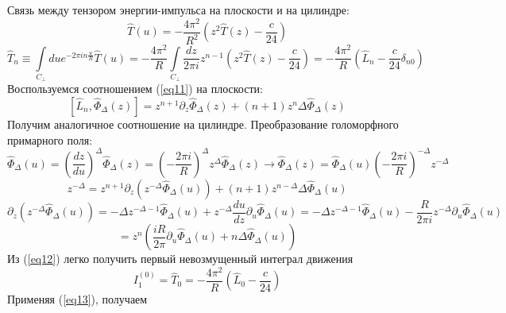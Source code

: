 \documentclass[12pt]{article}
\theoremstyle{definition}
\begin{document}
Связь между тензором энергии-импульса на плоскости и на цилиндре:
\begin{equation}
    \widehat{T}(u)=-\frac{4\pi^2}{R^2}\left(z^2\widehat{T}(z)-\frac{c}{24}\right)
\end{equation}
\begin{equation}\label{eq12}
    \widehat{T}_n\equiv\int\limits_{C_\perp}due^{-2\pi in\frac{u}{R}}\widehat{T}(u)=-\frac{4\pi^2}{R}\int\limits_{C_\perp}\frac{dz}{2\pi i}z^{n-1}\left(z^2\widehat{T}(z)-\frac{c}{24}\right)=-\frac{4\pi^2}{R}\left(\widehat{L}_{n}-\frac{c}{24}\delta_{n0}\right)
\end{equation}
Воспользуемся соотношением (\ref{eq11}) на плоскости:
\begin{equation}\label{eq13}
    [\widehat{L}_n,\widehat{\Phi}_\Delta(z)]=z^{n+1}\partial_z\widehat{\Phi}_\Delta(z)+(n+1)z^n\Delta\widehat{\Phi}_\Delta(z)
\end{equation}
Получим аналогичное соотношение на цилиндре. Преобразование голоморфного примарного поля:
\begin{equation}
    \widehat{\Phi}_\Delta(u)=\left(\frac{dz}{du}\right)^\Delta\widehat{\Phi}_\Delta(z)=\left(-\frac{2\pi i}{R}\right)^\Delta z^{\Delta}\widehat{\Phi}_\Delta(z)\rightarrow\widehat{\Phi}_\Delta(z)=\widehat{\Phi}_\Delta(u)\left(-\frac{2\pi i}{R}\right)^{-\Delta}z^{-\Delta}
\end{equation}
\begin{equation}
    [\widehat{L}_n,\widehat{\Phi}_\Delta(u)]z^{-\Delta}=z^{n+1}\partial_z(z^{-\Delta}\widehat{\Phi}_\Delta(u))+(n+1)z^{n-\Delta}\Delta\widehat{\Phi}_\Delta(u)
\end{equation}
\begin{equation}
    \partial_z(z^{-\Delta}\widehat{\Phi}_\Delta(u))=-\Delta z^{-\Delta-1}\widehat{\Phi}_\Delta(u)+z^{-\Delta}\frac{du}{dz}\partial_u\widehat{\Phi}_\Delta(u)=-\Delta z^{-\Delta-1}\widehat{\Phi}_\Delta(u)-\frac{R}{2\pi i}z^{-\Delta}\partial_u\widehat{\Phi}_\Delta(u)
\end{equation}
\begin{equation}
    [\widehat{L}_n,\widehat{\Phi}_\Delta(u)]=z^n\left(\frac{iR}{2\pi}\partial_u\widehat{\Phi}_\Delta(u)+n\Delta\widehat{\Phi}_\Delta(u)\right)
\end{equation}
Из (\ref{eq12}) легко получить первый невозмущенный интеграл движения
\begin{equation}
    I_1^{(0)}=\widehat{T}_0=-\frac{4\pi^2}{R}\left(\widehat{L}_0-\frac{c}{24}\right)
\end{equation}
Применяя (\ref{eq13}), получаем
\end{document}
